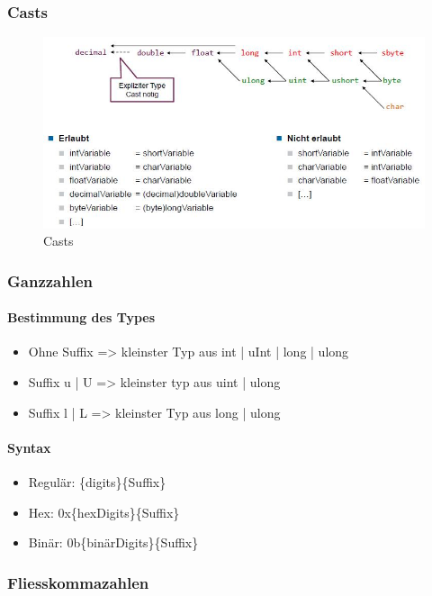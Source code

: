 \documentclass[
a4paper,
oneside,
10pt,
fleqn,
headsepline,
toc=listofnumbered, 
bibliography=totocnumbered]{scrartcl}
\begin{document}
\subsubsection{Casts}
\begin{figure}[h!]
\centering
\includegraphics[width=\linewidth]{images/casts}
\caption{Casts}
\label{fig:casts}
\end{figure}

\subsubsection{Ganzzahlen}
\paragraph{Bestimmung des Types}
\begin{itemize}
  \item Ohne Suffix => kleinster Typ aus int | uInt | long | ulong
  \item Suffix u | U => kleinster typ aus uint | ulong
  \item Suffix l | L => kleinster Typ aus long | ulong
\end{itemize}

\paragraph{Syntax}
\begin{itemize}
  \item Regulär: \{digits\}\{Suffix\}
  \item Hex: 0x\{hexDigits\}\{Suffix\}
  \item Binär: 0b\{binärDigits\}\{Suffix\}
\end{itemize}

\subsubsection{Fliesskommazahlen}
\end{document}
